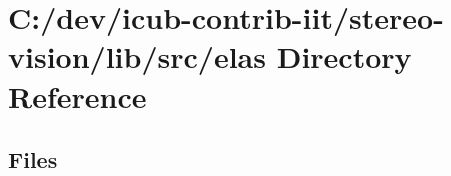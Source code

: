 \section{C\+:/dev/icub-\/contrib-\/iit/stereo-\/vision/lib/src/elas Directory Reference}
\label{dir_f39c8903d404d794e705ad03c67ee29e}
\subsection*{Files}
\begin{DoxyCompactItemize}
\end{DoxyCompactItemize}
